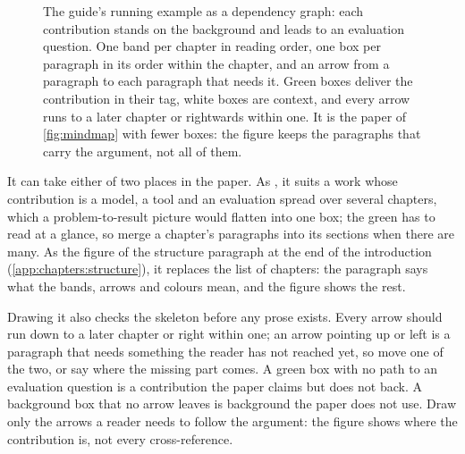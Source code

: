 \begin{figure}[!ht]
  \caption{The guide's running example as a dependency graph: each contribution stands on the background and leads to an evaluation question. One band per chapter in reading order, one box per paragraph in its order within the chapter, and an arrow from a paragraph to each paragraph that needs it. Green boxes deliver the contribution in their tag, white boxes are context, and every arrow runs to a later chapter or rightwards within one. It is the paper of \cref{fig:mindmap} with fewer boxes: the figure keeps the paragraphs that carry the argument, not all of them.}\label{fig:depgraph}
\end{figure}

It can take either of two places in the paper. As , it suits a work whose contribution is a model, a tool and an evaluation spread over several chapters, which a problem-to-result picture would flatten into one box; the green has to read at a glance, so merge a chapter's paragraphs into its sections when there are many. As the figure of the structure paragraph at the end of the introduction (\cref{app:chapters:structure}), it replaces the list of chapters: the paragraph says what the bands, arrows and colours mean, and the figure shows the rest.

Drawing it also checks the skeleton before any prose exists. Every arrow should run down to a later chapter or right within one; an arrow pointing up or left is a paragraph that needs something the reader has not reached yet, so move one of the two, or say where the missing part comes. A green box with no path to an evaluation question is a contribution the paper claims but does not back. A background box that no arrow leaves is background the paper does not use. Draw only the arrows a reader needs to follow the argument: the figure shows where the contribution is, not every cross-reference.

